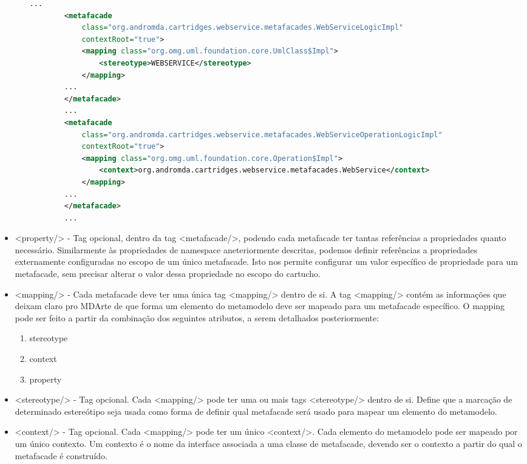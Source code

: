 \begin{itemize}
\begin{enumerate}
    \begin{lstlisting}[language=xml]
		...
		<metafacade
			class="org.andromda.cartridges.webservice.metafacades.WebServiceLogicImpl"
			contextRoot="true"> 
			<mapping class="org.omg.uml.foundation.core.UmlClass$Impl">
				<stereotype>WEBSERVICE</stereotype> 
			</mapping> 
		...
		</metafacade>
		...
		<metafacade
			class="org.andromda.cartridges.webservice.metafacades.WebServiceOperationLogicImpl"
			contextRoot="true">
			<mapping class="org.omg.uml.foundation.core.Operation$Impl">
				<context>org.andromda.cartridges.webservice.metafacades.WebService</context> 
			</mapping> 
		...
		</metafacade>
		...
	\end{lstlisting}
  \end{enumerate}
  
  \item <property/> - Tag opcional, dentro da tag <metafacade/>, podendo cada
  metafacade ter tantas referências a propriedades quanto necessário.
  Similarmente às propriedades de namespace aneteriormente descritas, podemos
  definir referências a propriedades externamente configuradas no escopo de um
  único metafacade. Isto nos permite configurar um valor específico de
  propriedade para um metafacade, sem precisar alterar o valor dessa propriedade
  no escopo do cartucho.
  \item <mapping/> - Cada metafacade deve ter uma única tag <mapping/>
  dentro de si. A tag <mapping/> contém as informações que deixam claro pro
  MDArte de que forma um elemento do metamodelo deve ser mapeado para um
  metafacade específico. O mapping pode ser feito a partir da combinação dos
  seguintes atributos, a serem detalhados posteriormente:

  \begin{enumerate}
    \item stereotype 
    \item context
    \item property
  \end{enumerate}
  
  \item <stereotype/> - Tag opcional. Cada <mapping/> pode ter uma ou mais tags
  <stereotype/> dentro de si. Define que a marcação de determinado estereótipo
  seja usada como forma de definir qual metafacade será usado para mapear um
  elemento do metamodelo.
  
  \item <context/> - Tag opcional. Cada <mapping/> pode ter um único
  <context/>. Cada elemento do metamodelo pode ser mapeado por um único
  contexto. Um contexto é o nome da interface associada a uma classe de
  metafacade, devendo ser o contexto a partir do qual o metafacade é
  construído.
  

\end{itemize}

